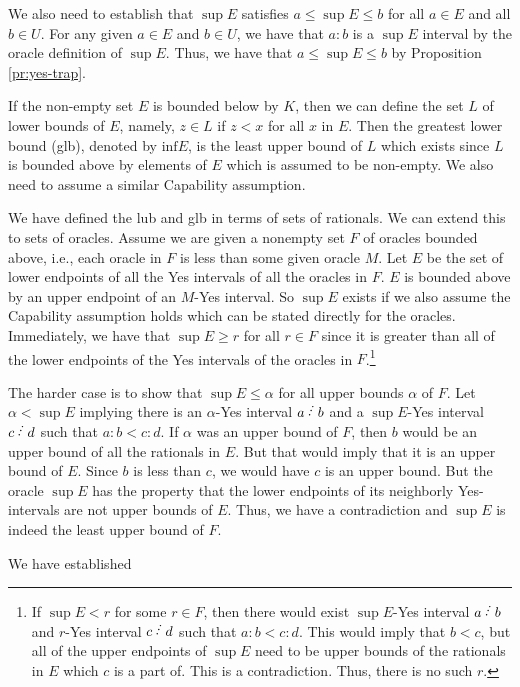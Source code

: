 \documentclass[12pt]{article}
\begin{document}
We also need to establish that $\sup E$ satisfies $a \leq \sup E \leq b$ for all $a \in E$ and all $b \in U$. For any given $a \in E$ and $b \in U$, we have that $a:b$ is a $\sup E$ interval by the oracle definition of $\sup E$. Thus, we have that $a \leq \sup E \leq b$ by Proposition \ref{pr:yes-trap}. 

If the non-empty set $E$ is bounded below by $K$, then we can define the set $L$ of lower bounds of $E$, namely, $z \in L$ if $z < x$ for all $x$ in $E$. Then the greatest lower bound (glb), denoted by $\mathrm{inf} E$, is the least upper bound of $L$ which exists since $L$ is bounded above by elements of $E$ which is assumed to be non-empty. We also need to assume  a similar Capability assumption. 

We have defined the lub and glb in terms of sets of rationals. We can extend this to sets of oracles. Assume we are given a nonempty set $F$ of oracles bounded above, i.e., each oracle in $F$ is less than some given oracle $M$. Let $E$ be the set of lower endpoints of all the Yes intervals of all the oracles in $F$. $E$ is bounded above by an upper endpoint of an $M$-Yes interval. So $\sup E$ exists if we also assume the Capability assumption holds which can be stated directly for the oracles. Immediately, we have that $\sup E \geq r$ for all $r \in F$ since it is greater than all of the lower endpoints of the Yes intervals of the oracles in $F$.\footnote{If $\sup E < r$ for some $r \in F$, then there would exist $\sup E$-Yes interval $a \lte b$ and $r$-Yes interval $c\lte d$ such that $a:b < c:d$. This would imply that $b < c$, but all of the upper endpoints of $\sup E$ need to be upper bounds of the rationals in $E$ which $c$ is a part of. This is a contradiction. Thus, there is no such $r$.}

The harder case is to show that $\sup E \leq \alpha$ for all upper bounds $\alpha$ of $F$. Let $\alpha < \sup E$ implying there is an $\alpha$-Yes interval $a\lte b$ and a $\sup E$-Yes interval $c\lte d$ such that $a:b < c:d$. If $\alpha$ was an upper bound of $F$, then $b$ would be an upper bound of all the rationals in $E$. But that would imply that it is an upper bound of $E$. Since $b$ is less than $c$, we would have $c$ is an upper bound. But the oracle $\sup E$ has the property that the lower endpoints of its neighborly Yes-intervals are not upper bounds of $E$. Thus, we have a contradiction and $\sup E$ is indeed the least upper bound of $F$.

We have established
\end{document}

